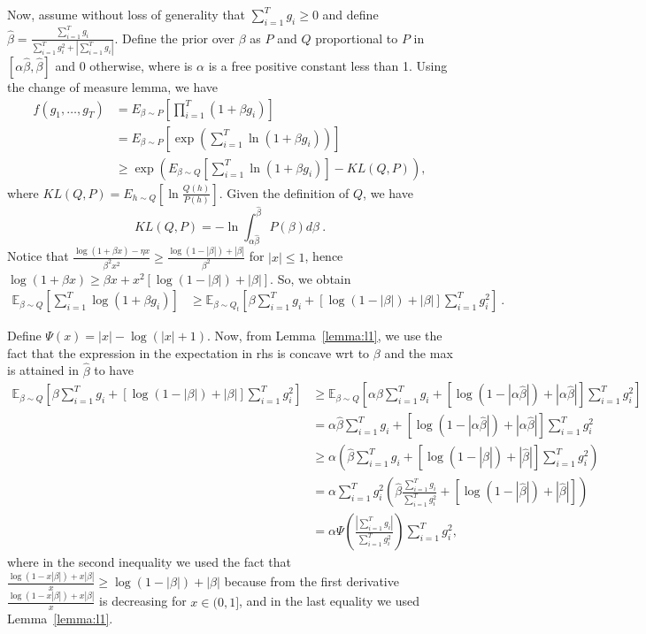 \documentclass{article}
\newcommand{\field}[1]{\mathbb{#1}}
\newcommand{\E}{\field{E}}
\begin{document}
Now, assume without loss of generality that $\sum_{i=1}^T g_i\geq0$ and define $\hat{\beta}=\frac{\sum_{i=1}^T g_i}{\sum_{i=1}^T g_i^2 + |\sum_{i=1}^T g_i|}$. Define the prior over $\beta$ as $P$ and $Q$ proportional to $P$ in $[\alpha \hat{\beta},\hat{\beta}]$ and 0 otherwise, where is $\alpha$ is a free positive constant less than 1.
Using the change of measure lemma, we have
\begin{align*}
f(g_1, \dots, g_{T})
&=E_{\beta\sim P} \left[\prod_{i=1}^{T}(1+\beta g_i) \right] \\
&=E_{\beta\sim P} \left[\exp\left(\sum_{i=1}^{T}\ln(1+\beta g_i)\right) \right] \\
& \geq \exp\left(E_{\beta\sim Q} \left[\sum_{i=1}^T \ln(1+\beta g_i) \right]-KL(Q,P)\right),
\end{align*}
where $KL(Q,P) = E_{h\sim Q}[\ln \frac{Q(h)}{P(h)}]$.
Given the definition of $Q$, we have
\[
KL(Q,P) = -\ln \int_{\alpha \hat{\beta}}^{\hat{\beta}} P(\beta) d\beta~.
\]
Notice that $\frac{\log(1+\beta x)-\eta x}{\beta^2 x^2} \geq \frac{\log(1-|\beta|)+|\beta|}{\beta^2}$ for $|x|\leq 1$, hence
$\log(1+\beta x)\geq \beta x + x^2 [\log(1-|\beta|)+|\beta|]$. So, we obtain
\begin{align*}
\E_{\beta\sim Q}\left[\sum_{i=1}^{T} \log(1+\beta g_i)\right]  
&\geq \E_{\beta\sim Q_t} \left[\beta \sum_{i=1}^T g_i + [\log(1-|\beta|)+|\beta|]\sum_{i=1}^T g_i^2\right]~.
\end{align*}

Define $\Psi(x)=|x|-\log(|x|+1)$.
Now, from Lemma~\ref{lemma:l1}, we use the fact that the expression in the expectation in rhs is concave wrt to $\beta$ and the max is attained in $\hat{\beta}$ to have
\begin{align*}
\E_{\beta\sim Q} \left[\beta \sum_{i=1}^T g_i + [\log(1-|\beta|)+|\beta|]\sum_{i=1}^T g_i^2\right]
&\geq \E_{\beta\sim Q}\left[\alpha \hat{\beta} \sum_{i=1}^T g_i + [\log(1-|\alpha\hat{\beta}|)+|\alpha\hat{\beta}|]\sum_{i=1}^T g_i^2\right]\\
&= \alpha \hat{\beta} \sum_{i=1}^T g_i + [\log(1-|\alpha\hat{\beta}|)+|\alpha\hat{\beta}|]\sum_{i=1}^T g_i^2\\
&\geq \alpha (\hat{\beta} \sum_{i=1}^T g_i + [\log(1-|\hat{\beta}|)+|\hat{\beta}|]\sum_{i=1}^T g_i^2)\\
&= \alpha \sum_{i=1}^T g_i^2 \left(\hat{\beta} \frac{\sum_{i=1}^T g_i}{\sum_{i=1}^T g_i^2} + [\log(1-|\hat{\beta}|)+|\hat{\beta}|]\right)\\
&= \alpha \Psi\left(\frac{|\sum_{i=1}^T g_i|}{\sum_{i=1}^T g_i^2}\right) \sum_{i=1}^T g_i^2,
\end{align*}
where in the second inequality we used the fact that $\frac{\log(1-x|\beta|)+x|\beta|}{x}\geq \log(1-|\beta|)+|\beta|$ because from the first derivative $\frac{\log(1-x|\beta|)+x|\beta|}{x}$ is decreasing for $x \in (0,1]$, and in the last equality we used Lemma~\ref{lemma:l1}.
\end{document}
